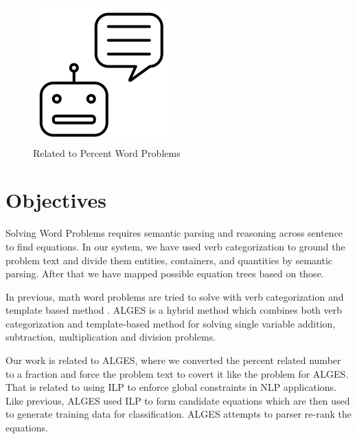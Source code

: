 \documentclass[document.tex]{subfiles}
\begin{document}
\begin{figure}[H]
\begin{multicols}{4}[\columnsep=2.0cm]
		\includegraphics[scale=0.35]{imgs/chatbot.png}
		
	\end{multicols}
	\caption {Related to Percent Word Problems\cite{1}}
	\label{fig:relatedFig}
\end{figure}

\section{Objectives}

Solving Word Problems requires semantic parsing and
reasoning across sentence to find equations. In our system, we
have used verb categorization to ground the problem text and
divide them entities, containers, and quantities by semantic
parsing. After that we have mapped possible equation trees
based on those.

In previous, math word problems are tried to
solve with verb categorization \cite{1} and template based method \cite{2}. ALGES \cite{3} is a hybrid method which combines both verb categorization and template-based method for solving single variable addition, subtraction, multiplication and division
problems.

Our work is related to ALGES, where we converted the percent related number to a fraction and force the problem text to covert it like the problem for ALGES. That is related to using ILP to enforce global constraints in NLP applications\cite{24}. Like previous\cite{25, 26, 27, 28}, ALGES used ILP to form candidate equations which are then used to generate training data for classification. ALGES attempts to parser re-rank the equations\cite{29, 30}.

%
%
\end{document}

